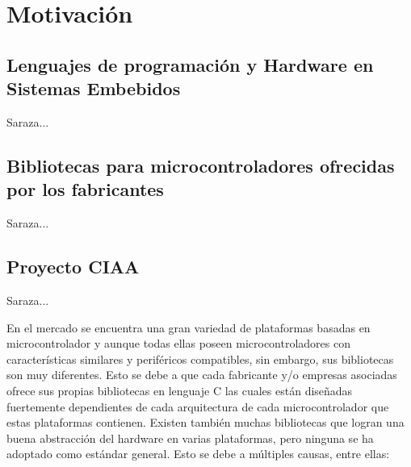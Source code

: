 \section{Motivación}
\label{sec:motivacion}


\subsection{Lenguajes de programación y Hardware en Sistemas Embebidos}

Saraza...


\subsection{Bibliotecas para microcontroladores ofrecidas por los fabricantes}

Saraza...

\subsection{Proyecto CIAA}

Saraza...



En el mercado se encuentra una gran variedad de plataformas basadas en microcontrolador y aunque todas ellas poseen microcontroladores con características similares y periféricos compatibles, sin embargo, sus bibliotecas son muy diferentes. Esto se debe a que cada fabricante y/o empresas asociadas ofrece sus propias bibliotecas en lenguaje C las cuales están diseñadas fuertemente dependientes de cada arquitectura de cada microcontrolador que estas plataformas contienen.
Existen también muchas bibliotecas que logran una buena abstracción del hardware en varias plataformas, pero ninguna se ha adoptado como estándar general. Esto se debe a múltiples causas, entre ellas:


